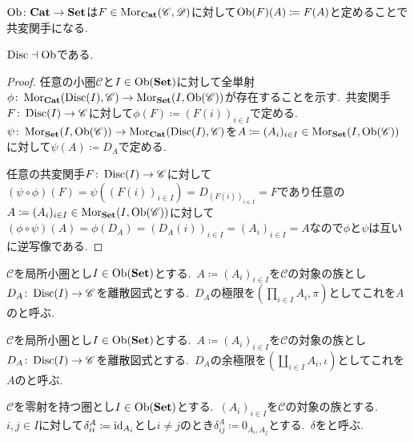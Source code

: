 \begin{remark} \label{rem: ob_is_functor}
$\operatorname{Ob} \colon \mathbf{Cat} \to \mathbf{Set}$は$F \in \operatorname{Mor}_{\mathbf{Cat}}(\mathscr{C}, \mathscr{D})$に対して$\operatorname{Ob}(F)(A) \coloneq F(A)$と定めることで共変関手になる.
\end{remark}

\begin{proposition} \label{prop: discrete_left_adjoint_ob}
$\operatorname{Disc} \dashv \operatorname{Ob}$である.
\end{proposition}

\begin{proof}
任意の小圏$\mathscr{C}$と$I \in \operatorname{Ob}(\mathbf{Set})$に対して全単射$\phi \colon \operatorname{Mor}_{\mathbf{Cat}}(\operatorname{Disc}(I), \mathscr{C}) \to \operatorname{Mor}_{\mathbf{Set}}(I, \operatorname{Ob}(\mathscr{C}))$が存在することを示す.\
共変関手$F \colon \operatorname{Disc}(I) \to \mathscr{C}$に対して$\phi(F) \coloneq (F(i))_{i \in I}$で定める.\
$\psi \colon \operatorname{Mor}_{\mathbf{Set}}(I, \operatorname{Ob}(\mathscr{C})) \to \operatorname{Mor}_{\mathbf{Cat}}(\operatorname{Disc}(I), \mathscr{C})$を$A \coloneq (A_i)_{i \in I} \in \operatorname{Mor}_{\mathbf{Set}}(I, \operatorname{Ob}(\mathscr{C}))$に対して$\psi(A) \coloneq D_A$で定める.\

任意の共変関手$F \colon \operatorname{Disc}(I) \to \mathscr{C}$に対して$(\psi \circ \phi)(F) =\psi((F(i))_{i \in I}) = D_{(F(i))_{i \in I}} = F$であり任意の$A \coloneq (A_i)_{i \in I} \in \operatorname{Mor}_{\mathbf{Set}}(I, \operatorname{Ob}(\mathscr{C}))$に対して$(\phi \circ \psi)(A) = \phi(D_A) = (D_A(i))_{i \in I} = (A_i)_{i \in I} = A$なので$\phi$と$\psi$は互いに逆写像である.
\end{proof}

\begin{definition} \label{def: Family.directProduct}
	$\mathscr{C}$を局所小圏とし$I \in \operatorname{Ob}(\mathbf{Set})$とする.\
	$A \coloneq (A_i)_{i \in I}$を$\mathscr{C}$の対象の族とし$D_A \colon \operatorname{Disc}(I) \to \mathscr{C}$を離散図式とする.\
	$D_A$の極限を$(\prod_{i \in I} A_i, \pi )$としてこれを$A$のと呼ぶ.
\end{definition}

\begin{definition} \label{def: Family.directSum}
	$\mathscr{C}$を局所小圏とし$I \in \operatorname{Ob}(\mathbf{Set})$とする.\
	$A \coloneq (A_i)_{i \in I}$を$\mathscr{C}$の対象の族とし$D_A \colon \operatorname{Disc}(I) \to \mathscr{C}$を離散図式とする.\
	$D_A$の余極限を$(\coprod_{i \in I} A_i, \iota)$としてこれを$A$のと呼ぶ.
\end{definition}

\begin{definition} \label{def: kroneckerDelta}
$\mathscr{C}$を零射を持つ圏とし$I \in \operatorname{Ob}(\mathbf{Set})$とする.\
$(A_i)_{i \in I}$を$\mathscr{C}$の対象の族とする.\
$i,j \in I$に対して$\delta_{ii}^A \coloneq \operatorname{id}_{A_i}$とし$i \neq j$のとき$\delta_{ij}^A \coloneq 0_{A_i,A_j}$とする.\
$\delta$をと呼ぶ.
\end{definition}

